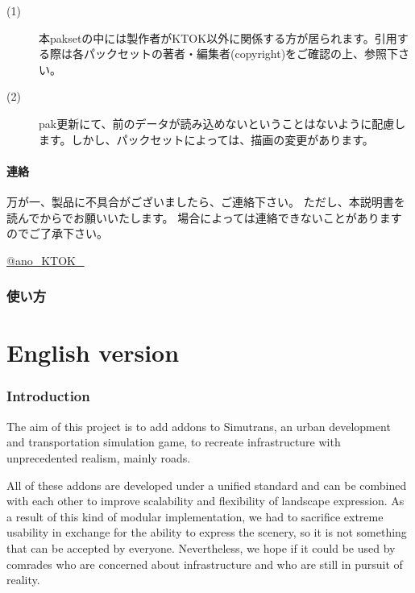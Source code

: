 \documentclass{jarticle}
\begin{document}
\begin{description}
  \item[(1)]
    本paksetの中には製作者がKTOK以外に関係する方が居られます。引用する際は各パックセットの著者・編集者(copyright)をご確認の上、参照下さい。
  \item[(2)]
    pak更新にて、前のデータが読み込めないということはないように配慮します。しかし、パックセットによっては、描画の変更があります。
\end{description}

\subsection*{連絡}
万が一、製品に不具合がございましたら、ご連絡下さい。 ただし、本説明書を読んでからでお願いいたします。 場合によっては連絡できないことがありますのでご了承下さい。

\href{https://twitter.com/ano_KTOK_}{@ano\_KTOK\_}

\newpage

\section{使い方}


\newpage

\part{English version}

\section{Introduction}

The aim of this project is to add addons to Simutrans, an urban development and transportation simulation game, to recreate infrastructure with unprecedented realism, mainly roads.

All of these addons are developed under a unified standard and can be combined with each other to improve scalability and flexibility of landscape expression.
As a result of this kind of modular implementation, we had to sacrifice extreme usability in exchange for the ability to express the scenery, so it is not something that can be accepted by everyone.
Nevertheless, we hope if it could be used by comrades who are concerned about infrastructure and who are still in pursuit of reality.
\end{document}
